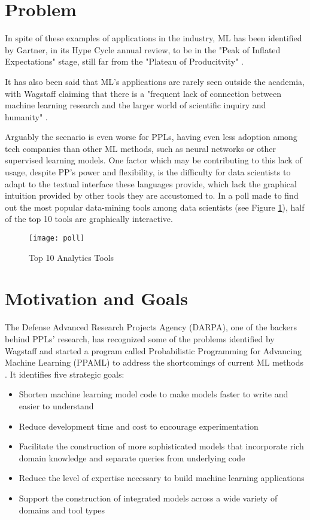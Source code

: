 \section{Problem} \label{sec:proj}

In spite of these examples of applications in the industry, ML has been
identified by Gartner, in its Hype Cycle annual review,
to be in the "Peak of Inflated Expectations" stage, still far
from the "Plateau of Producitvity" \cite{gartner}.

It has also been said that ML's applications are rarely seen
outside the academia, with Wagstaff claiming that there is a "frequent lack of
connection between machine learning research and the larger world of scientific
inquiry and humanity" \cite{Wagstaff2012}.

Arguably the scenario is even worse for PPLs, having even less adoption
among tech companies than other ML methods, such as neural networks or other
supervised learning models. One factor which may be contributing to this lack of
usage, despite PP's power and flexibility, is the difficulty for data scientists
to adapt to the textual interface these languages provide, which lack the graphical
intuition provided by other tools they are accustomed to. In a poll made to find
out the most popular data-mining tools among data scientists
(see Figure \ref{fig:poll}), half of the top 10 tools are
graphically interactive.

\begin{figure}[t]
  \begin{center}
    \leavevmode
    \texttt{[image: poll]}
    \caption{Top 10 Analytics Tools \cite{kdn}}
    \label{fig:poll}
  \end{center}
\end{figure}

\section{Motivation and Goals} \label{sec:goals}

The Defense Advanced Research Projects Agency (DARPA), one of the backers behind
PPLs' research, has recognized some of the problems
identified by Wagstaff and started a program called Probabilistic Programming
for Advancing Machine Learning (PPAML) to address the shortcomings of
current ML methods \cite{darpa}. It identifies five strategic goals:

\begin{itemize}
  \item Shorten machine learning model code to make models faster to write and
  easier to understand
  \item Reduce development time and cost to encourage experimentation
  \item Facilitate the construction of more sophisticated models that
  incorporate rich domain knowledge and separate queries from underlying code
  \item Reduce the level of expertise necessary to build machine learning
  applications
  \item Support the construction of integrated models across a wide variety of
  domains and tool types
\end{itemize}

